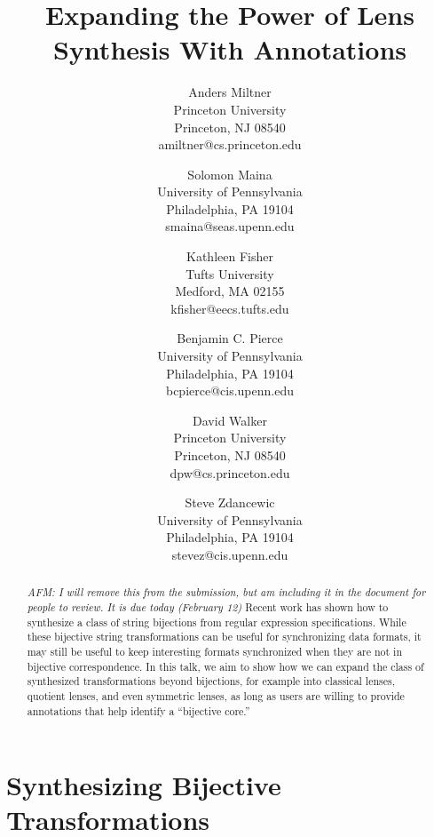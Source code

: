 \documentclass[a4paper]{article}
\title{Expanding the Power of Lens Synthesis With Annotations}
\author{
Anders Miltner \\ Princeton University\\
Princeton, NJ 08540 \\ amiltner@cs.princeton.edu
\and
Solomon Maina \\ University of Pennsylvania\\
Philadelphia, PA 19104 \\ smaina@seas.upenn.edu
\and
Kathleen Fisher \\ Tufts University\\
Medford, MA 02155 \\ kfisher@eecs.tufts.edu
\and
Benjamin C. Pierce \\ University of Pennsylvania\\
Philadelphia, PA 19104 \\ bcpierce@cis.upenn.edu
\and
David Walker \\ Princeton University\\
Princeton, NJ 08540 \\ dpw@cs.princeton.edu
\and
Steve Zdancewic \\ University of Pennsylvania\\
Philadelphia, PA 19104 \\ stevez@cis.upenn.edu
}
\begin{document}
\maketitle



\begin{abstract}
  \emph{AFM: I will remove this from the submission, but am including it in the
    document for people to review. It is due today (February 12)} Recent work has shown how to synthesize a class of string bijections from
  regular expression specifications. While these bijective string
  transformations can be useful for synchronizing data formats, it may still be
  useful to keep interesting formats synchronized when they are not in bijective
  correspondence. In this talk, we aim to show how we can expand the class of
  synthesized transformations beyond bijections, for example into classical
  lenses, quotient lenses, and even symmetric lenses, as long as users are
  willing to provide annotations that help identify a ``bijective core.''
\end{abstract}
\vskip 32pt

\section{Synthesizing Bijective Transformations}
\end{document}

